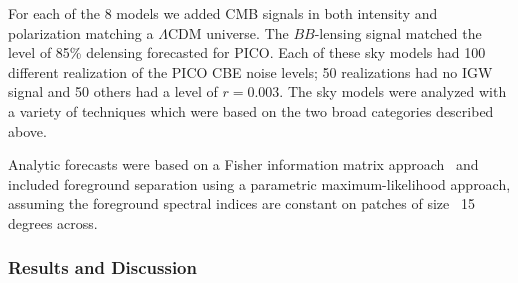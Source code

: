 \documentclass[PICOReport.tex]{subfiles}
\begin{document}
For each of the 8 models we added CMB signals in both intensity and polarization matching a $\Lambda$CDM universe. The $BB$-lensing signal matched the level of 85\% delensing forecasted for PICO. Each of these sky models had 100 different realization of the PICO CBE noise levels; 50 realizations had no \ac{IGW} signal and 50 others had a level of $r=0.003$. 
The sky models were analyzed with a variety of techniques which were based on the two broad categories described above. 

Analytic forecasts were based on a Fisher information matrix approach~\citep{errard_feeney} and included foreground separation
using a parametric maximum-likelihood approach, assuming the foreground spectral indices are constant on patches of size ~15 degrees across. 



\subsubsection{Results and Discussion}
\end{document}
